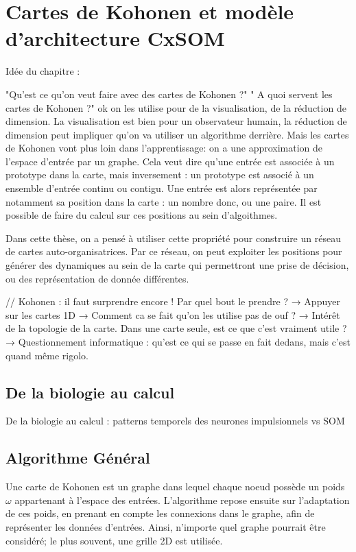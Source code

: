 \chapter{Cartes de Kohonen et modèle d'architecture CxSOM}
\graphicspath{{02-SOM/}}


Idée du chapitre : 

"Qu'est ce qu'on veut faire avec des cartes de Kohonen ?" 
" A quoi servent les cartes de Kohonen ?" ok on les utilise pour de la visualisation, de la réduction de dimension. La visualisation est bien pour un observateur humain, la réduction de dimension peut impliquer qu'on va utiliser un algorithme derrière. Mais les cartes de Kohonen vont plus loin dans l'apprentissage: on a une approximation de l'espace d'entrée par un graphe. Cela veut dire qu'une entrée est associée à un prototype dans la carte, mais inversement : un prototype est associé à un ensemble d'entrée continu ou contigu.
Une entrée est alors représentée par notamment sa position dans la carte : un nombre donc, ou une paire. 
Il est possible de faire du calcul sur ces positions au sein d'algoithmes. 

Dans cette thèse, on a pensé à utiliser cette propriété pour construire un réseau de cartes auto-organisatrices. Par ce réseau, on peut exploiter les positions pour générer des dynamiques au sein de la carte qui permettront une prise de décision, ou des représentation de donnée différentes. 




// Kohonen : il faut surprendre encore ! Par quel 
bout le prendre ? 
→ Appuyer sur les cartes 1D
→ Comment ca se fait qu’on les utilise pas de ouf ? 
→  Intérêt de la topologie de la carte. Dans une carte seule, est ce que c’est vraiment utile ?
→ Questionnement informatique : qu’est ce qui se passe en fait dedans, mais c’est quand même rigolo. 

\section{De la biologie au calcul}

De la biologie au calcul : patterns temporels des neurones impulsionnels vs SOM

\section{Algorithme Général}
Une carte de Kohonen est un graphe dans lequel chaque noeud possède un poids $\omega$ appartenant à l'espace des entrées. L'algorithme repose ensuite sur l'adaptation de ces poids, en prenant en compte les connexions dans le graphe, afin de représenter les données d'entrées. 
Ainsi, n'importe quel graphe pourrait être considéré; le plus souvent, une grille 2D est utilisée.

